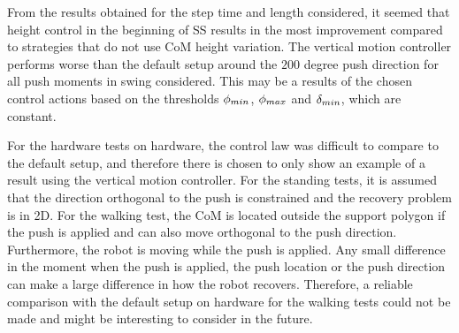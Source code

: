 From the results obtained for the step time and length considered, it seemed that height control in the beginning of \ac{SS} results in the most improvement compared to strategies that do not use \ac{CoM} height variation. The vertical motion controller performs worse than the default setup around the $200$ degree push direction for all push moments in swing considered. This may be a results of the chosen control actions based on the thresholds $\phi_{min}$, $\phi_{max}$ and $\delta_{min}$, which are constant.

For the hardware tests on hardware, the control law was difficult to compare to the default setup, and therefore there is chosen to only show an example of a result using the vertical motion controller. For the standing tests, it is assumed that the direction orthogonal to the push is constrained and the recovery problem is in \ac{2D}. For the walking test, the \ac{CoM} is located outside the support polygon if the push is applied and can also move orthogonal to the push direction. Furthermore, the robot is moving while the push is applied. Any small difference in the moment when the push is applied, the push location or the push direction can make a large difference in how the robot recovers. Therefore, a reliable comparison with the default setup on hardware for the walking tests could not be made and might be interesting to consider in the future. 
